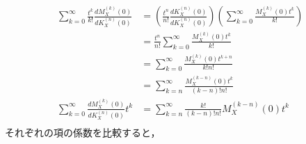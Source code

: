 \documentclass[dvipdfmx]{jsarticle}
\begin{document}
 \begin{align}
  \sum_{k=0}^\infty\frac{t^k}{k!}\frac{dM_X^{\left(k\right)}\left(0\right)}{dK_X^{\left(n\right)}\left(0\right)}&=\left(\frac{t^n}{n!}\frac{dK_X^{\left(n\right)}\left(0\right)}{dK_X^{\left(n\right)}\left(0\right)}\right)\left(\sum_{k=0}^\infty\frac{M_X^{\left(k\right)}\left(0\right)t^k}{k!}\right)\nonumber\\
  &=\frac{t^n}{n!}\sum_{k=0}^\infty\frac{M_X^{\left(k\right)}\left(0\right)t^k}{k!}\nonumber\\
  &=\sum_{k=0}^\infty\frac{M_X^{\left(k\right)}\left(0\right)t^{k+n}}{k!n!}\nonumber\\
  &=\sum_{k=n}^\infty\frac{M_X^{\left(k-n\right)}\left(0\right)t^k}{\left(k-n\right)!n!}\nonumber\\
  \sum_{k=0}^\infty\frac{dM_X^{\left(k\right)}\left(0\right)}{dK_X^{\left(n\right)}\left(0\right)}t^k&=\sum_{k=n}^\infty\frac{k!}{\left(k-n\right)!n!}M_X^{\left(k-n\right)}\left(0\right)t^k\nonumber\\
 \end{align}
それぞれの項の係数を比較すると，
\end{document}
